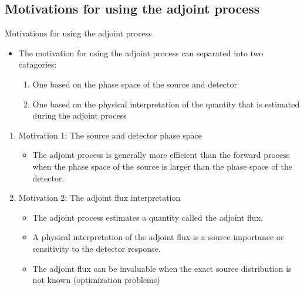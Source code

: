 \documentclass{beamer}
\begin{document}
\subsection{Motivations for using the adjoint process}
\begin{frame}{Motivations for using the adjoint process}

  \begin{itemize} 
    \item The motivation for using the adjoint process can separated into two
    catagories:
      \begin{enumerate}
        \item One based on the phase space of the source and detector
        \item One based on the physical interpretation of the quantity that is 
          estimated during the adjoint process
      \end{enumerate}
  \end{itemize}

  \begin{enumerate}
    \item Motivation 1: The source and detector phase space
      \begin{itemize}
        \item The adjoint process is generally more efficient than the forward 
          process when the phase space of the source is larger than the phase 
          space of the detector.
      \end{itemize}
      \medskip
    \item Motivation 2: The adjoint flux interpretation
      \begin{itemize}
        \item The adjoint process estimates a quantity called the adjoint flux.
        \item A physical interpretation of the adjoint flux is a source 
          importance or sensitivity to the detector response.
        \item The adjoint flux can be invaluable when the exact source 
          distribution is not known (optimization problems)
      \end{itemize}
  \end{enumerate}

\end{frame}
\end{document}
